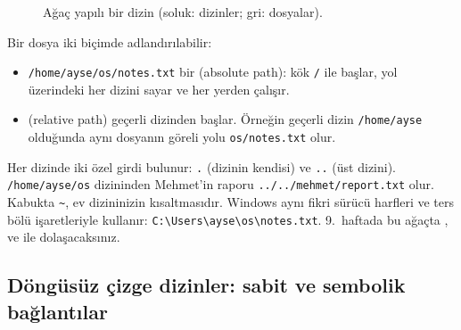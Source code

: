\begin{figure}[H]
\centering
{}
\caption{Ağaç yapılı bir dizin (soluk: dizinler; gri: dosyalar).}
\label{fig:tree}
\end{figure}

Bir dosya iki biçimde adlandırılabilir:
\begin{itemize}
  \item \texttt{/home/ayse/os/notes.txt} bir  (absolute path): kök \texttt{/} ile başlar, yol üzerindeki her dizini sayar ve her yerden çalışır.
  \item {} (relative path) geçerli dizinden başlar. Örneğin geçerli dizin \texttt{/home/ayse} olduğunda aynı dosyanın göreli yolu \texttt{os/notes.txt} olur.
\end{itemize}
Her dizinde iki özel girdi bulunur: \texttt{.} (dizinin kendisi) ve \texttt{..} (üst dizini). \texttt{/\allowbreak{}home/\allowbreak{}ayse/\allowbreak{}os} dizininden Mehmet'in raporu \texttt{../\allowbreak{}../\allowbreak{}mehmet/\allowbreak{}report.txt} olur. Kabukta \texttt{\textasciitilde}, ev dizininizin kısaltmasıdır. Windows aynı fikri sürücü harfleri ve ters bölü işaretleriyle kullanır: \texttt{C:\textbackslash{}Users\textbackslash{}ayse\textbackslash{}os\textbackslash{}notes.txt}. 9.\ haftada bu ağaçta ,  ve  ile dolaşacaksınız.

\subsection{Döngüsüz çizge dizinler: sabit ve sembolik bağlantılar}
\label{sec:acyclic}

